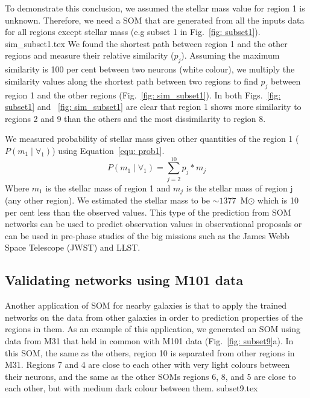                 To demonstrate this conclusion, we assumed the stellar mass value for region 1 is unknown.
                Therefore, we need a SOM that are generated from all the inputs data for all regions except stellar mass (e.g subset 1 in Fig.~\ref{fig: subset1}).
                {sim_subset1.tex}
                We found the shortest path between region 1 and the other regions and measure their relative similarity ($p_j$).
                Assuming the maximum similarity is 100 per cent between two neurons (white colour), we multiply the similarity values along the shortest path between two regions to find $p_j$ between region 1 and the other regions (Fig.~\ref{fig: sim_subset1}).
                In both Figs.~\ref{fig: subset1} and ~\ref{fig: sim_subset1} are clear that region 1 shows more similarity to regions 2 and 9 than the others and the most dissimilarity to region 8. 
                
                We measured probability of stellar mass given other quantities of the region 1 ($P(m_1\mid \forall_1)$) using Equation~\ref{equ: prob1}.
                \begin{equation}
                \label{equ: prob1}
                    P(m_1\mid \forall_1) = \sum_{j=2}^{10}p_j*m_j
                \end{equation}
                Where $m_1$ is the stellar mass of region 1 and $m_j$ is the stellar mass of region j (any other region).
                We estimated the stellar mass to be $\sim1377$~M$\odot$ which is 10 per cent less than the observed values.
                This type of the prediction from SOM networks can be used to predict observation values in observational proposals or can be used in pre-phase studies of the big missions such as the James Webb Space Telescope (JWST) and LLST.
                

    \subsection{Validating networks using M101 data}
    Another application of SOM for nearby galaxies is that to apply the trained networks on the data from other galaxies in order to prediction properties of the regions in them. %
    As an example of this application, we generated an SOM using data from M31 that held in common with M101 data (Fig.~\ref{fig: subset9}a). 
    In this SOM, the same as the others, region 10 is separated from other regions in M31.
    Regions 7 and 4 are close to each other with very light colours between their neurons, and the same as the other SOMs regions 6, 8, and 5 are close to each other, but with medium dark colour between them.
    {subset9.tex}
    
